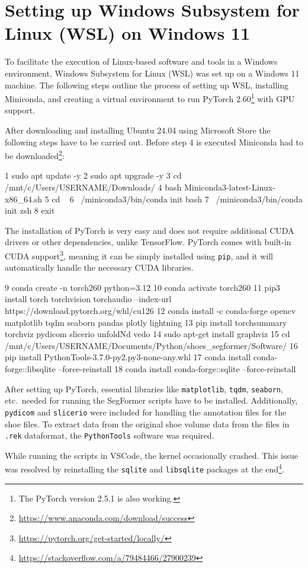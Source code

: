 \chapter[Setting up Windows Subsystem for Linux (WSL)]{Setting up Windows Subsystem for Linux (WSL) on Windows 11} \label{sec::WSL}
To facilitate the execution of Linux-based software and tools in a Windows environment, Windows Subsystem for Linux (WSL) was set up on a Windows 11 machine. The following steps outline the process of setting up WSL, installing Miniconda, and creating a virtual environment to run PyTorch 2.60\footnote{The PyTorch version 2.5.1 is also working.} with GPU support.

After downloading and installing Ubuntu 24.04 using Microsoft Store the following steps have to be carried out. Before step 4 is executed Miniconda had to be downloaded\footnote{\url{https://www.anaconda.com/download/success}}:
\begin{tcolorbox}[breakable, enhanced, width=\textwidth, colback={lightgray}]  
\begin{Python}
1  sudo apt update -y
2  sudo apt upgrade -y
3  cd /mnt/c/Users/USERNAME/Downloads/
4  bash Miniconda3-latest-Linux-x86_64.sh
5  cd ~
6  ~/miniconda3/bin/conda init bash
7  ~/miniconda3/bin/conda init zsh
8  exit
\end{Python}
\end{tcolorbox}		

The installation of PyTorch is very easy and does not require additional  CUDA drivers or other dependencies, unlike TensorFlow. PyTorch comes with built-in CUDA support\footnote{\url{https://pytorch.org/get-started/locally/}}, meaning it can be simply installed using {\tt pip}, and it will automatically handle the necessary CUDA libraries.
\begin{tcolorbox}[breakable, enhanced, width=\textwidth, colback={lightgray}]  
\begin{Python}
 9  conda create -n torch260 python=3.12
10  conda activate torch260
11  pip3 install torch torchvision torchaudio --index-url https://download.pytorch.org/whl/cu126
12  conda install -c conda-forge opencv matplotlib tqdm seaborn pandas plotly lightning
13  pip install torchsummary torchviz pydicom slicerio unfoldNd vedo
14  sudo apt-get install graphviz
15  cd /mnt/c/Users/USERNAME/Documents/Python/shoes_segformer/Software/
16  pip install PythonTools-3.7.0-py2.py3-none-any.whl
17  conda install conda-forge::libsqlite --force-reinstall
18  conda install conda-forge::sqlite --force-reinstall
\end{Python}
\end{tcolorbox}		
After setting up PyTorch, essential libraries like {\tt matplotlib}, {\tt tqdm}, {\tt seaborn}, etc.~needed for running the SegFormer scripts have to be installed. Additionally, {\tt pydicom} and {\tt slicerio} were included for handling the annotation files for the shoe files. To extract data from the original shoe volume data from the files in {\tt .rek} dataformat, the {\tt PythonTools} software was required.

While running the scripts in VSCode, the kernel occasionally crashed. This issue was resolved by reinstalling the {\tt sqlite} and {\tt libsqlite} packages at the end\footnote{\url{https://stackoverflow.com/a/79484466/27900239}}.
